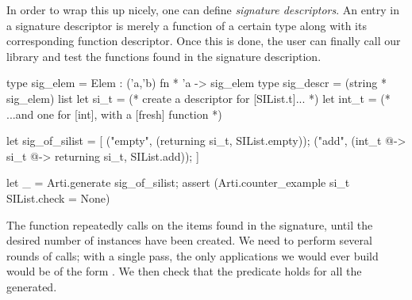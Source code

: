 In order to wrap this up nicely, one can define \emph{signature descriptors}. An
entry in a signature descriptor is merely a function of a certain
type  along with its corresponding function descriptor. Once this is
done, the user can finally call our library and test the functions found in the
signature description.
%
\begin{ocamlcode}
type sig_elem = Elem : ('a,'b) fn * 'a -> sig_elem
type sig_descr = (string * sig_elem) list
let si_t  =
  (* create a descriptor for [SIList.t]... *)
let int_t =
  (* ...and one for [int], with a [fresh] function *)

let sig_of_silist = [
  ("empty", (returning si_t, SIList.empty));
  ("add", (int_t @-> si_t @-> returning si_t, SIList.add));
]

let _ =
  Arti.generate sig_of_silist;
  assert (Arti.counter_example si_t SIList.check = None)
\end{ocamlcode}
%
The  function repeatedly calls  on the items found in
the signature, until the desired number of instances have been created. We need
to perform several rounds of calls; with a single pass, the only applications we
would ever build would be of the form . We then check that the
 predicate holds for all the  generated.
